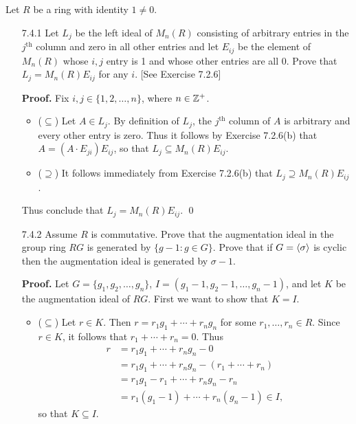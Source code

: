 Let $R$ be a ring with identity $1 \neq 0$.

\begin{enumerate}
   \item[7.4.1]   Let $L_j$ be the left ideal of $M_n(R)$ consisting of
                  arbitrary entries in the $j^{\text{th}}$ column and zero in
                  all other entries and let $E_{ij}$ be the element of $M_n(R)$
                  whose $i, j$ entry is 1 and whose other entries are all 0. 
                  Prove that $L_j = M_n(R)E_{ij}$ for any $i$.
                  [See Exercise 7.2.6]

      \textbf{Proof.} Fix $i, j \in \{1, 2, \ldots, n\}$, where $n \in \mathbb{Z}^+$.

      \begin{itemize}
         \item ($\subseteq$) Let $A \in L_j$. By definition of $L_j$, the
               $j^{\text{th}}$ column of $A$ is arbitrary and every other entry 
               is zero. Thus it follows by Exercise 7.2.6(b) that
               $A = (A\cdot E_{ji})E_{ij}$, so that
               $L_j \subseteq M_n(R)E_{ij}$.

         \item ($\supseteq$) It follows immediately from Exercise 7.2.6(b) that
               $L_j \supseteq M_n(R)E_{ij}$.
      \end{itemize}
      Thus conclude that $L_j = M_n(R)E_{ij}$. \qed
   \item[7.4.2]   Assume $R$ is commutative. Prove that the augmentation ideal
                  in the group ring $RG$ is generated by $\{g - 1 : g \in G\}$.
                  Prove that if $G = \langle \sigma \rangle$ is cyclic then the 
                  augmentation ideal is generated by $\sigma - 1$.

      \textbf{Proof.} Let $G = \{g_1, g_2, \ldots, g_n\}$,
      $I = (g_1 - 1, g_2 - 1, \ldots, g_n - 1)$, and let $K$ be the augmentation 
      ideal of $RG$. First we want to show that $K = I$.

      \begin{itemize}
         \item ($\subseteq$) Let $r \in K$. Then $r = r_1g_1 + \cdots + r_ng_n$
               for some $r_1, \ldots, r_n \in R$. Since $r \in K$, it follows
               that $r_1 + \cdots + r_n = 0$. Thus
               \begin{align*}
                  r &= r_1g_1 + \cdots + r_ng_n - 0 \\
                    &= r_1g_1 + \cdots + r_ng_n - (r_1 + \cdots + r_n) \\
                    &= r_1g_1 - r_1 + \cdots + r_ng_n - r_n \\
                    &= r_1(g_1 - 1) + \cdots + r_n(g_n - 1) \in I,
               \end{align*}
               so that $K \subseteq I$.


\end{itemize}
\end{enumerate}
